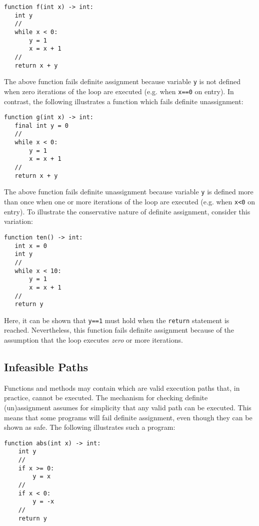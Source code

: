 \begin{lstlisting}
function f(int x) -> int:
   int y
   //
   while x < 0:
       y = 1
       x = x + 1
   //
   return x + y
\end{lstlisting}

The above function fails definite assignment because variable
\lstinline{y} is not defined when zero iterations of the loop are
executed (e.g. when \lstinline{x==0} on entry).  In contrast, the
following illustrates a function which fails definite unassignment:

\begin{lstlisting}
function g(int x) -> int:
   final int y = 0
   //
   while x < 0:
       y = 1
       x = x + 1
   //
   return x + y
\end{lstlisting}

The above function fails definite unassignment because variable
\lstinline{y} is defined more than once when one or more iterations of
the loop are executed (e.g. when \lstinline{x<0} on entry).  To
illustrate the conservative nature of definite assignment, consider
this variation:

\begin{lstlisting}
function ten() -> int:
   int x = 0
   int y
   //
   while x < 10:
       y = 1
       x = x + 1
   //
   return y
\end{lstlisting}

Here, it can be shown that \lstinline{y==1} must hold when the
\lstinline{return} statement is reached.  Nevertheless, this function
fails definite assignment because of the assumption that the loop
executes {\em zero} or more iterations.

\subsection{Infeasible Paths}

Functions and methods may contain  which are valid execution paths that, in practice, cannot be
executed.  The mechanism for checking definite (un)assignment assumes
for simplicity that any valid path can be executed.  This means that
some programs will fail definite assignment, even though they can be
shown as safe.  The following illustrates such a program:

\begin{lstlisting}
function abs(int x) -> int:
    int y
    //
    if x >= 0:
        y = x
    //
    if x < 0:
        y = -x
    //
    return y
\end{lstlisting}

